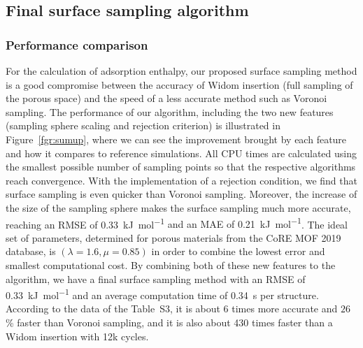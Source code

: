 \documentclass[main]{subfiles}
\begin{document}
\subsection{Final surface sampling algorithm}

\subsubsection{Performance comparison}

For the calculation of adsorption enthalpy, our proposed surface sampling method is a good compromise between the accuracy of Widom insertion (full sampling of the porous space) and the speed of a less accurate method such as Voronoi sampling. The performance of our algorithm, including the two new features (sampling sphere scaling and rejection criterion) is illustrated in Figure~\ref{fgr:sumup}, where we can see the improvement brought by each feature and how it compares to reference simulations. All CPU times are calculated using the smallest possible number of sampling points so that the respective algorithms reach convergence. With the implementation of a rejection condition, we find that surface sampling is even quicker than Voronoi sampling. Moreover, the increase of the size of the sampling sphere makes the surface sampling much more accurate, reaching an RMSE of \SI{0.33}{\kilo\joule\per\mole} {and an MAE of \SI{0.21}{\kilo\joule\per\mole}}. The ideal set of parameters, determined for porous materials from the CoRE MOF 2019 database, is $(\lambda = 1.6, \mu = 0.85)$ in order to combine the lowest error and smallest computational cost. By combining both of these new features to the algorithm, we have a final surface sampling method with an RMSE of \SI{0.33}{\kilo\joule\per\mole} and an average computation time of \SI{0.34}{\second} per structure. According to the data of the Table~S3, it is about 6 times more accurate and {$26$\%} faster than Voronoi sampling, and it is also about 430 times faster than a Widom insertion with 12k cycles.
\end{document}
